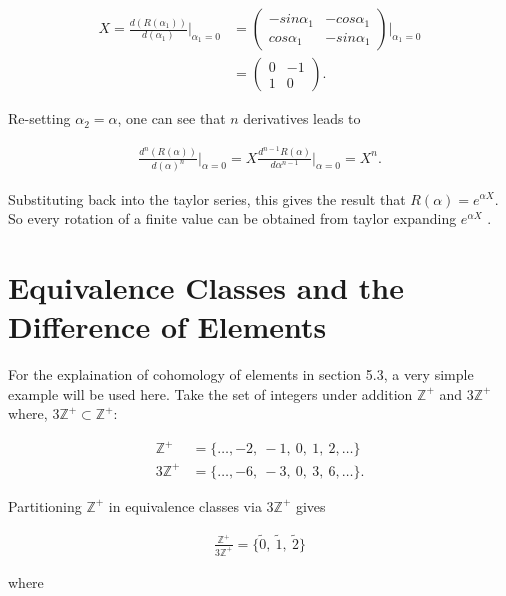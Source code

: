 \documentclass[fleqn, twocolumn, 10pt]{article}
\begin{document}
\begin{ceqn}
\begin{align*}
X = \frac{d(R(\alpha_1))}{d(\alpha_1)} \biggr\rvert_{\alpha_1 = 0} &= 
\begin{pmatrix}
-sin\alpha_1 & -cos\alpha_1\\
cos\alpha_1 & -sin\alpha_1
\end{pmatrix}
\biggr \rvert_{\alpha_1 = 0}\\ &=
\begin{pmatrix}
0 & -1\\
1 & 0
\end{pmatrix}.
\end{align*}
\end{ceqn}
Re-setting $\alpha_2 = \alpha$, one can see that $n$ derivatives leads to 

\begin{ceqn}
\begin{align*}
\frac{d^n(R(\alpha))}{d(\alpha)^n} \biggr\rvert_{\alpha = 0} = X \frac{d^{n-1}R(\alpha)}{d\alpha^{n-1}}\biggr\rvert_{\alpha = 0} = X^n.
\end{align*}
\end{ceqn}
Substituting back into the taylor series, this gives the result that $R(\alpha) = e^{\alpha X}$. So every rotation of a finite value can be obtained from taylor expanding $e^{\alpha X}$ \cite{b2001russell}.



\section{Equivalence Classes and the Difference of Elements}

For the explaination of cohomology of elements in section 5.3, a very simple example will be used here. Take the set of integers under addition $\mathbb{Z}^+$ and $3\mathbb{Z}^+$ where, $3\mathbb{Z}^+ \subset \mathbb{Z}^+$:

\begin{ceqn}
\begin{align*}
\mathbb{Z}^+ &= \{\ldots, -2,\:-1,\:0,\:1,\:2, \ldots\} \\
3\mathbb{Z}^+ &= \{\ldots, -6,\:-3,\:0,\:3,\:6, \ldots\}.
\end{align*}
\end{ceqn} 
Partitioning $\mathbb{Z}^+$ in equivalence classes via $3\mathbb{Z}^+$ gives

\begin{ceqn}
\begin{align*}
\frac{\mathbb{Z}^+}{3\mathbb{Z}^+} = \{\widetilde{0},\: \widetilde{1},\: \widetilde{2}\}
\end{align*}
\end{ceqn} 
where
\end{document}
